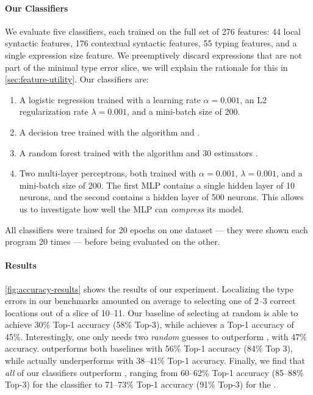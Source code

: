 \paragraph{Our Classifiers}
We evaluate five classifiers, each trained on the full set of 276
features: 44 local syntactic features, 176 contextual syntactic
features, 55 typing features, and a single expression size feature.
%
%
We preemptively discard expressions that are not part of the minimal
type error slice, we will explain the rationale for this in
\autoref{sec:feature-utility}.
%
Our classifiers are:
%
\begin{enumerate}
\item A logistic regression trained with a learning rate
  $\alpha = 0.001$, an L2 regularization rate $\lambda = 0.001$, and a
  mini-batch size of 200.
\item A decision tree trained with the  algorithm and .
\item A random forest trained with the  algorithm and 30 estimators .
\item Two multi-layer perceptrons, both trained with $\alpha = 0.001$,
  $\lambda = 0.001$, and a mini-batch size of 200. The first MLP
  contains a single hidden layer of 10 neurons, and the second contains
  a hidden layer of 500 neurons. This allows us to investigate how well
  the MLP can \emph{compress} its model.
\end{enumerate}
%
All classifiers were trained for 20 epochs on one dataset
--- \ie they were shown each program 20 times ---
before being evaluated on the other.



\paragraph{Results}
\autoref{fig:accuracy-results} shows the results of our experiment.
%
Localizing the type errors in our benchmarks amounted on average to
selecting one of 2--3 correct locations out of a slice of 10--11.
%
Our baseline of selecting at random is able to achieve 30\% Top-1
accuracy (58\% Top-3), while \ocaml achieves a Top-1 accuracy of 45\%.
%
Interestingly, one only needs two \emph{random} guesses to outperform
\ocaml, with 47\% accuracy.
%
\sherrloc outperforms both baselines with 56\% Top-1 accuracy (84\% Top
3), while \mycroft actually underperforms \ocaml with 38--41\% Top-1
accuracy.
%
Finally, we find that \emph{all} of our classifiers outperform \sherrloc,
ranging from 60--62\% Top-1 accuracy (85--88\% Top-3) for the \linear
classifier to 71--73\% Top-1 accuracy (91\% Top-3) for the \hiddenFH.

